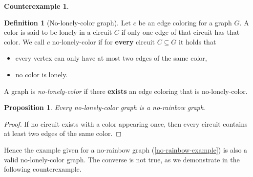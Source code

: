 \documentclass[a4paper,10pt]{article}
\numberwithin{equation}{section}
\newtheorem{proposition}[theorem]{Proposition}
\theoremstyle{definition}
\newtheorem{definition}[theorem]{Definition}
\newtheorem*{counterexample}{Counterexample}
\begin{document}
    \begin{counterexample}
    \end{counterexample}
    \begin{definition}[No-lonely-color graph]\label{def:lonely}
        Let \(c\) be an edge coloring for a graph \(G\). A color is said to be lonely in a circuit \(C\) if only one edge of that circuit has that color. We call \(c\) no-lonely-color if for \textbf{every} circuit \(C\subseteq G\) it holds that
        \begin{itemize}
            \item every vertex can only have at most two edges of the same color,
            \item no color is lonely.
        \end{itemize}
        A graph is \emph{no-lonely-color} if there \textbf{exists} an edge coloring that is no-lonely-color. 
    \end{definition}
    \begin{proposition}
        Every no-lonely-color graph is a no-rainbow graph.
    \end{proposition}
    \begin{proof}
        If no circuit exists with a color appearing once, then every circuit contains at least two edges of the same color.
    \end{proof}
    Hence the example given for a no-rainbow graph (\ref{no-rainbow-example}) is also a valid no-lonely-color graph. The converse is not true, as we demonstrate in the following counterexample.
\end{document}
